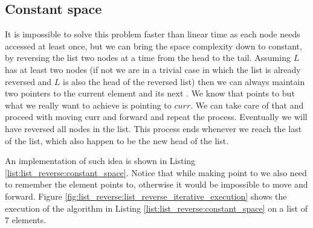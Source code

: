 

\subsection{Constant space}
It is impossible to solve this problem faster than linear time as each node needs accessed at least
once, but we can bring the space complexity down to constant, by reversing the list two nodes at a
time from the head to the tail. Assuming $L$ has at least two nodes (if not we are in a trivial case
in which the list is already reversed and $L$ is also the head of the reversed list) then we can
always maintain two pointers to the current element and its next . We know that
points to  but what we really want to achieve is  pointing to $curr$.
We can take care of that and proceed with moving curr and  forward and repeat the process.
Eventually we will have reversed all nodes in the list. This process ends whenever we reach the last
of the list, which also happen to be the new head of the list.

An implementation of such idea is shown in Listing \ref{list:list_reverse:constant_space}. Notice
that while making  point to we also need to remember the element
 points to, otherwise it would be impossible to move  and
 forward.
Figure \ref{fig:list_reverse:list_reverse_iterative_execution} shows the execution of the algorithm in Listing \ref{list:list_reverse:constant_space} on a list of $7$ elements.




